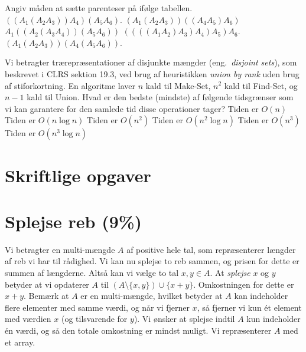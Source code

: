\medskip\noindent
Angiv måden at sætte parenteser på ifølge tabellen.
\etsvar
%
\mulighederstart
\svar $((A_1( A_2A_3))A_4)(A_5A_6)$.\korrekt
\svar $(A_1(A_2 A_3))((A_4 A_5)A_6)$
\svar $A_1((A_2(A_3A_4))(A_5 A_6))$ 
\svar $((((A_1 A_2)A_3)A_4)A_5)A_6$.
\svar $(A_1(A_2 A_3))(A_4(A_5 A_6))$.
\mulighederslut
{}


Vi betragter trærepræsentationer af disjunkte mængder (eng.~\emph{disjoint sets}), som beskrevet i CLRS sektion 19.3, ved brug af heuristikken \emph{union by rank} uden brug af stiforkortning.
En algoritme laver $n$ kald til {\sc Make-Set}, $n^2$ kald til {\sc Find-Set}, og $n-1$ kald til {\sc Union}.
Hvad er den bedste (mindste) af følgende tidsgrænser som vi kan garantere for den samlede tid disse operationer tager?
\etsvar
\mulighederstart
\svar Tiden er $O(n)$
\svar Tiden er $O(n \log n)$
\svar Tiden er $O(n^2)$
\svar Tiden er $O(n^2 \log n)$ \korrekt
\svar Tiden er $O(n^3)$
\svar Tiden er $O(n^3 \log n)$
\mulighederslut
{}


\multiplechoiceslut

\newpage

\section*{Skriftlige opgaver}\label{sec:written}




\section{Splejse reb (9\%)}

Vi betragter en multi-mængde $A$ af positive hele tal, som repræsenterer længder af reb vi har til rådighed.
Vi kan nu splejse to reb sammen, og prisen for dette er summen af længderne.
Altså kan vi vælge to tal $x,y\in A$.
At \emph{splejse} $x$ og $y$ betyder at vi opdaterer $A$ til $(A\setminus\{x,y\})\cup\{x+y\}$.
Omkostningen for dette er $x+y$.
Bemærk at $A$ er en multi-mængde, hvilket betyder at $A$ kan indeholder flere elementer med samme værdi, og når vi fjerner $x$, så fjerner vi kun ét element med værdien $x$ (og tilsvarende for $y$).
Vi ønsker at splejse indtil $A$ kun indeholder én værdi, og så den totale omkostning er mindst muligt.
Vi repræsenterer $A$ med et array.


